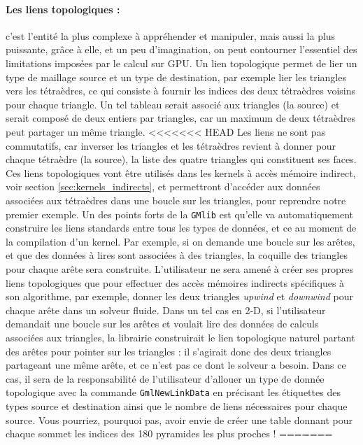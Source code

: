 \documentclass[a4paper,12pt]{article}
\begin{document}
\paragraph{Les liens topologiques : } c'est l'entité la plus complexe à appréhender et manipuler, mais aussi la plus puissante, grâce à elle, et un peu d'imagination, on peut contourner l'essentiel des limitations imposées par le calcul sur GPU.
Un lien topologique permet de lier un type de maillage source et un type de destination, par exemple lier les triangles vers les tétraèdres, ce qui consiste à fournir les indices des deux tétraèdres voisins pour chaque triangle.
Un tel tableau serait associé aux triangles (la source) et serait composé de deux entiers par triangles, car un maximum de deux tétraèdres peut partager un même triangle.
<<<<<<< HEAD
Les liens ne sont pas commutatifs, car inverser les triangles et les tétraèdres revient à donner pour chaque tétraèdre (la source), la liste des quatre triangles qui constituent ses faces.
Ces liens topologiques vont être utilisés dans les kernels à accès mémoire indirect, voir section \ref{sec:kernels_indirects}, et permettront d'accéder aux données associées aux tétraèdres dans une boucle sur les triangles, pour reprendre notre premier exemple.
Un des points forts de la {\tt GMlib} est qu'elle va automatiquement construire les liens standards entre tous les types de données, et ce au moment de la compilation d'un kernel.
Par exemple, si on demande une boucle sur les arêtes, et que des données à lires sont associées à des triangles, la coquille des triangles pour chaque arête sera construite.
L'utilisateur ne sera amené à créer ses propres liens topologiques que pour effectuer des accès mémoires indirects spécifiques à son algorithme, par exemple, donner les deux triangles \emph{upwind} et \emph{downwind} pour chaque arête dans un solveur fluide.
Dans un tel cas en 2-D, si l'utilisateur demandait une boucle sur les arêtes et voulait lire des données de calculs associées aux triangles, la librairie construirait le lien topologique naturel partant des arêtes pour pointer sur les triangles : il s'agirait donc des deux triangles partageant une même arête, et ce n'est pas ce dont le solveur a besoin.
Dans ce cas, il sera de la responsabilité de l'utilisateur d'allouer un type de donnée topologique avec la commande {\tt GmlNewLinkData} en précisant les étiquettes des types source et destination ainsi que le nombre de liens nécessaires pour chaque source.
Vous pourriez, pourquoi pas, avoir envie de créer une table donnant pour chaque sommet les indices des 180 pyramides les plus proches !
=======
\end{document}
